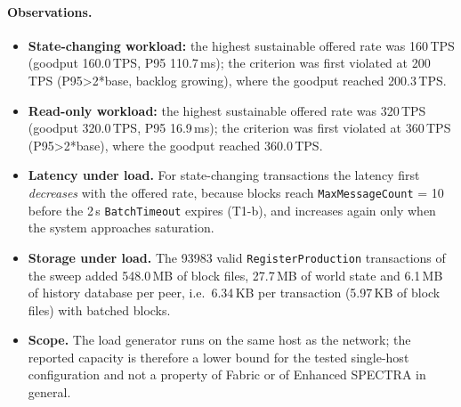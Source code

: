\paragraph{Observations.}
\begin{itemize}
  \item \textbf{State-changing workload:} the highest sustainable offered rate was 160\,TPS (goodput 160.0\,TPS, P95 110.7\,ms); the criterion was first violated at 200\,TPS (P95>2*base, backlog growing), where the goodput reached 200.3\,TPS.
  \item \textbf{Read-only workload:} the highest sustainable offered rate was 320\,TPS (goodput 320.0\,TPS, P95 16.9\,ms); the criterion was first violated at 360\,TPS (P95>2*base), where the goodput reached 360.0\,TPS.
  \item \textbf{Latency under load.} For state-changing transactions the latency first \emph{decreases} with the offered
        rate, because blocks reach \texttt{MaxMessageCount} = 10 before the 2\,s \texttt{BatchTimeout} expires (T1-b), and
        increases again only when the system approaches saturation.
  \item \textbf{Storage under load.} The 93983 valid \texttt{RegisterProduction} transactions of the sweep
        added 548.0\,MB of block files, 27.7\,MB of world state and
        6.1\,MB of history database per peer, i.e.\ 6.34\,KB per transaction
        (5.97\,KB of block files) with batched blocks.
  \item \textbf{Scope.} The load generator runs on the same host as the network; the reported capacity is therefore a
        lower bound for the tested single-host configuration and not a property of Fabric or of Enhanced SPECTRA in
        general.
\end{itemize}
